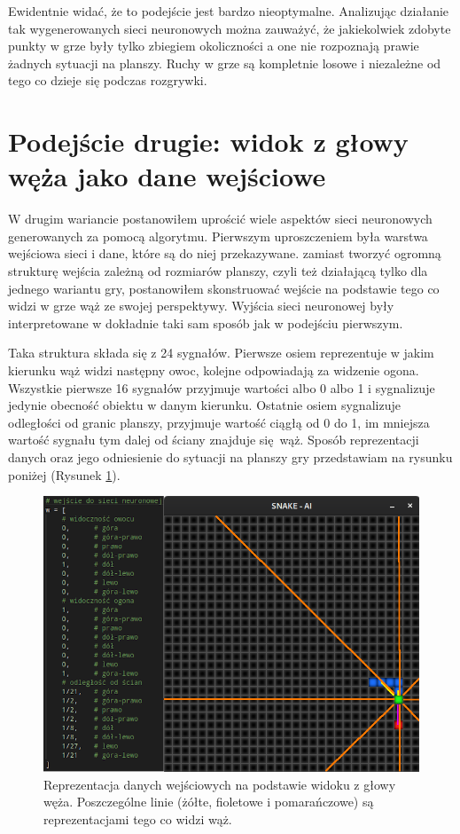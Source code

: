 \documentclass[12pt, oneside, a4paper]{report}
\begin{document}
Ewidentnie widać, że to podejście jest bardzo nieoptymalne. Analizując działanie tak wygenerowanych sieci neuronowych można zauważyć, że jakiekolwiek zdobyte punkty w grze były tylko zbiegiem okoliczności a one nie rozpoznają prawie żadnych sytuacji na planszy. Ruchy w grze są kompletnie losowe i niezależne od tego co dzieje się podczas rozgrywki.

\section{Podejście drugie: widok z głowy węża jako dane wejściowe}

W drugim wariancie postanowiłem uprościć wiele aspektów sieci neuronowych generowanych za pomocą algorytmu. Pierwszym uproszczeniem była warstwa wejściowa sieci i dane, które są do niej przekazywane. zamiast tworzyć ogromną strukturę wejścia zależną od rozmiarów planszy, czyli też działającą tylko dla jednego wariantu gry, postanowiłem skonstruować wejście na podstawie tego co widzi w grze wąż ze swojej perspektywy. Wyjścia sieci neuronowej były interpretowane w dokładnie taki sam sposób jak w podejściu pierwszym.

Taka struktura składa się z 24 sygnałów. Pierwsze osiem reprezentuje w jakim kierunku wąż widzi następny owoc, kolejne odpowiadają za widzenie ogona. Wszystkie pierwsze 16 sygnałów przyjmuje wartości albo 0 albo 1 i sygnalizuje jedynie obecność obiektu w danym kierunku. Ostatnie osiem sygnalizuje odległości od granic planszy, przyjmuje wartość ciągłą od 0 do 1, im mniejsza wartość sygnału tym dalej od ściany znajduje się wąż. Sposób reprezentacji danych oraz jego odniesienie do sytuacji na planszy gry przedstawiam na rysunku poniżej (Rysunek \ref{fig: 4.head-view}).

\begin{figure}[h]
	\centering
	\includegraphics[width=13cm]{head-view.png}
	\caption{Reprezentacja danych wejściowych na podstawie widoku z głowy węża. Poszczególne linie (żółte, fioletowe i pomarańczowe) są reprezentacjami tego co widzi wąż.}
	\label{fig: 4.head-view}
\end{figure}
\end{document}
